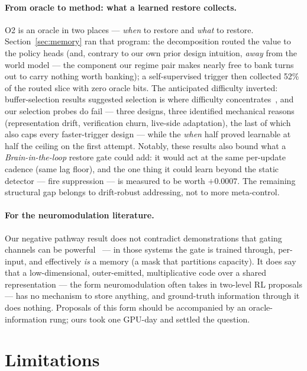 \documentclass[11pt]{article}
\begin{document}
\paragraph{From oracle to method: what a learned restore collects.}
O2 is an oracle in two places --- \emph{when} to restore and \emph{what} to
restore. Section~\ref{sec:memory} ran that program: the decomposition routed
the value to the policy heads (and, contrary to our own prior design
intuition, \emph{away} from the world model --- the component our regime pair
makes nearly free to bank turns out to carry nothing worth banking); a
self-supervised trigger then collected 52\% of the routed slice with zero
oracle bits. The anticipated difficulty inverted: buffer-selection results
suggested selection is where difficulty
concentrates~\citep{isele2018selectivereplay,kessler2023continualdreamer},
and our selection probes do fail --- three designs, three identified
mechanical reasons (representation drift, verification churn, live-side
adaptation), the last of which also caps every faster-trigger design ---
while the \emph{when} half proved learnable at half the ceiling on the first
attempt. Notably, these results also bound
what a \emph{Brain-in-the-loop} restore gate could add: it would act at the
same per-update cadence (same lag floor), and the one thing it could learn
beyond the static detector --- fire suppression --- is measured to be worth
$+0.0007$. The remaining structural gap belongs to drift-robust addressing,
not to more meta-control.

\paragraph{For the neuromodulation literature.}
Our negative pathway result does not contradict demonstrations that gating
channels can be powerful~\citep{beaulieu2020anml,serra2018hat,miconi2019backpropamine}
--- in those systems the gate is trained through, per-input, and effectively
\emph{is} a memory (a mask that partitions capacity). It does say that a
low-dimensional, outer-emitted, multiplicative code over a shared
representation --- the form neuromodulation often takes in two-level RL
proposals --- has no mechanism to store anything, and ground-truth information
through it does nothing. Proposals of this form should be accompanied by an
oracle-information rung; ours took one GPU-day and settled the question.

\section{Limitations}
\label{sec:limitations}
\end{document}
